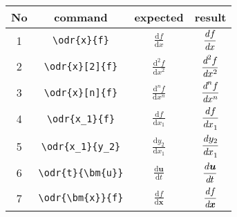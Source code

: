 \documentclass{jsarticle}
\renewcommand{\d}{\textrm{d}}
\begin{document}
%
\begin{table}[htpt]
\centering
\begin{tabular}{cccc}
No & command & expected & result \\
\hline
1&	\verb|\odr{x}{f}|				& $\displaystyle \frac{\d f}{\d x}$
									& $\displaystyle \odr{x}{f}$ \\[3mm]
2&	\verb|\odr{x}[2]{f}|			& $\displaystyle \frac{\d^2 f}{\d x^2}$
									& $\displaystyle \odr{x}[2]{f}$ \\[3mm]
3&	\verb|\odr{x}[n]{f}|			& $\displaystyle \frac{\d^n f}{\d x^n}$
									& $\displaystyle \odr{x}[n]{f}$ \\[3mm]
4&	\verb|\odr{x_1}{f}|				& $\displaystyle \frac{\d f}{\d x_1}$
									& $\displaystyle \odr{x_1}{f}$ \\[3mm]
5&	\verb|\odr{x_1}{y_2}|			& $\displaystyle \frac{\d y_2}{\d x_1}$
									& $\displaystyle \odr{x_1}{y_2}$ \\[3mm]
6&	\verb|\odr{t}{\bm{u}}|			& $\displaystyle \frac{\d\bm{u}}{\d t}$
									& $\displaystyle \odr{t}{\bm{u}}$ \\[3mm]
7&	\verb|\odr{\bm{x}}{f}|			& $\displaystyle \frac{\d f}{\d\bm{x}}$
									& $\displaystyle \odr{\bm{x}}{f}$ \\[3mm]
\end{tabular}
\end{table}
%
\end{document}
